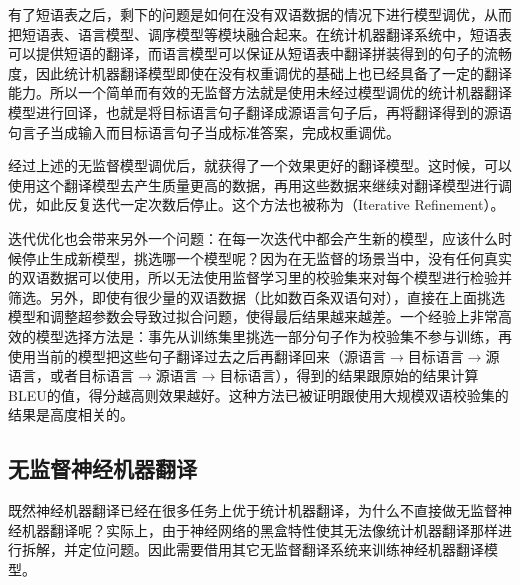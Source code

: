 \parinterval 有了短语表之后，剩下的问题是如何在没有双语数据的情况下进行模型调优，从而把短语表、语言模型、调序模型等模块融合起来。在统计机器翻译系统中，短语表可以提供短语的翻译，而语言模型可以保证从短语表中翻译拼装得到的句子的流畅度，因此统计机器翻译模型即使在没有权重调优的基础上也已经具备了一定的翻译能力。所以一个简单而有效的无监督方法就是使用未经过模型调优的统计机器翻译模型进行回译，也就是将目标语言句子翻译成源语言句子后，再将翻译得到的源语句言子当成输入而目标语言句子当成标准答案，完成权重调优。

\parinterval 经过上述的无监督模型调优后，就获得了一个效果更好的翻译模型。这时候，可以使用这个翻译模型去产生质量更高的数据，再用这些数据来继续对翻译模型进行调优，如此反复迭代一定次数后停止。这个方法也被称为{\small{}}（Iterative Refinement）。

\parinterval 迭代优化也会带来另外一个问题：在每一次迭代中都会产生新的模型，应该什么时候停止生成新模型，挑选哪一个模型呢？因为在无监督的场景当中，没有任何真实的双语数据可以使用，所以无法使用监督学习里的校验集来对每个模型进行检验并筛选。另外，即使有很少量的双语数据（比如数百条双语句对），直接在上面挑选模型和调整超参数会导致过拟合问题，使得最后结果越来越差。一个经验上非常高效的模型选择方法是：事先从训练集里挑选一部分句子作为校验集不参与训练，再使用当前的模型把这些句子翻译过去之后再翻译回来（源语言$\to $目标语言$\to$源语言，或者目标语言$\to$源语言$\to$目标语言），得到的结果跟原始的结果计算BLEU的值，得分越高则效果越好。这种方法已被证明跟使用大规模双语校验集的结果是高度相关的。


\subsection{无监督神经机器翻译}\label{unsupervised-NMT}

\parinterval 既然神经机器翻译已经在很多任务上优于统计机器翻译，为什么不直接做无监督神经机器翻译呢？实际上，由于神经网络的黑盒特性使其无法像统计机器翻译那样进行拆解，并定位问题。因此需要借用其它无监督翻译系统来训练神经机器翻译模型。

